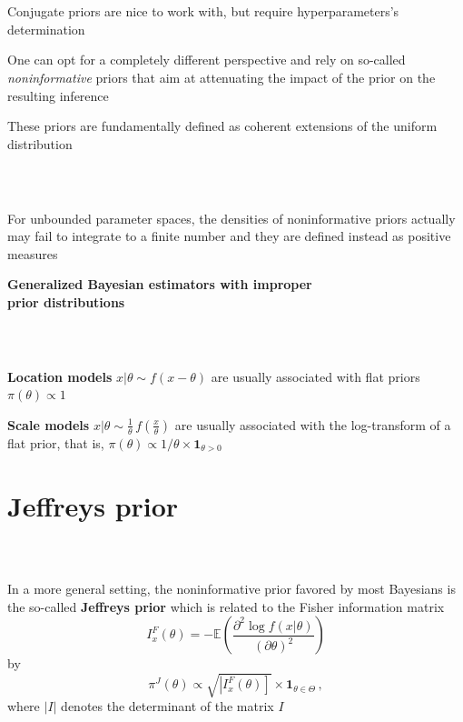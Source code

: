 \documentclass[notes,professionalfont,11pt,usenames,dvipsnames]{beamer}
\newcommand\justify{\rightskip0pt \leftskip0pt}
\newenvironment{slide}
{\begin{frame}[environment=slide]
\frametitle{\insertsection \\ \insertsubsection}\justify\setlength{\parskip}{0.5cm}\vspace{-1cm}}
{\end{frame}}
\begin{document}
\begin{slide}

Conjugate priors are nice to work with, 
but require hyperparameters's determination


One can opt for a completely different perspective 
and rely on so-called {\em noninformative} priors that aim at attenuating the impact 
of the prior on the resulting inference


These priors are fundamentally defined as coherent extensions of the uniform distribution

\end{slide}

\begin{slide}

For unbounded parameter spaces, the densities of noninformative
priors actually may fail to integrate to a finite number and they are defined
instead as positive measures


{\bf\color{red} Generalized Bayesian estimators with improper \\ prior distributions}

\end{slide}

\begin{slide}

{\bf Location models} $x|\theta \sim f(x-\theta)$
are usually associated with flat priors $\pi(\theta)\propto 1$


{\bf Scale models} $x|\theta \sim \frac{1}{\theta}\,f\left(\frac{x}{\theta}\right)$
are usually associated with the log-transform of a flat prior, that is,
$\pi(\theta) \propto 1/\theta\times \mathbf{1}_{\theta>0}$

\end{slide}

\section{Jeffreys prior}

\begin{slide}

In a more general setting, the noninformative prior favored by most Ba\-ye\-si\-ans is
the so-called {\bf Jeffreys prior} 
which is related to the Fisher information matrix 
$$
I_x^F(\theta) = -\mathbb{E}\left(\dfrac{\partial^2 \log f(x|\theta) }{ (\partial \theta)^2}\right)
$$
by
$$
\pi^J(\theta) \propto \sqrt{\left| I_x^F(\theta) \right]}\times \mathbf{1}_{\theta\in\Theta}\,,
$$
where $|I|$ denotes the determinant of the matrix $I$

\end{slide}
\end{document}
